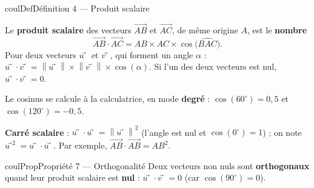 \documentclass[11pt,a4paper]{article}
\makeatletter
\newcommand{\vect}[1]{\overrightarrow{#1}}
\newcommand{\norme}[1]{\left\lVert #1 \right\rVert}
\newcommand{\pt}[3]{\path (#1) node[croix]{} node[#2,font=\small,inner sep=2.5pt]{$#3$};}
\newcounter{lycee@signet}
\newcommand{\signet}[3][]{\stepcounter{lycee@signet}%
  \edef\lycee@dest{\if\relax\detokenize{#1}\relax
    signet.\arabic{lycee@signet}\else#1\fi}%
  \hypertarget{\lycee@dest}{}\bookmark[level=#2,dest=\lycee@dest]{#3}}
\def\vec#1{#1⃗}}%
\newenvironment{definitionbox}[1][Définition]%
  {\begin{boitecours}[phantom={\signet{2}{#1}}]{coulDef}{#1}}{\end{boitecours}}
\newenvironment{proprietebox}[1][Propriété]%
  {\begin{boitecours}[phantom={\signet{2}{#1}}]{coulProp}{#1}}{\end{boitecours}}
\makeatother
\begin{document}
\begin{definitionbox}[Définition 4 --- Produit scalaire]
\begin{minipage}[t]{0.58\linewidth}\raggedright
Le \textbf{produit scalaire} des vecteurs $\vect{AB}$ et $\vect{AC}$, de même origine
$A$, est le \textbf{nombre}
\[
  \vect{AB}\cdot\vect{AC}=AB\times AC\times\cos\big(\widehat{BAC}\big).
\]
Pour deux vecteurs $\vec{u}$ et $\vec{v}$, qui forment un angle $\alpha$ :
$\vec{u}\cdot\vec{v}=\norme{\vec{u}}\times\norme{\vec{v}}\times\cos(\alpha)$.
Si l'un des deux vecteurs est nul, $\vec{u}\cdot\vec{v}=0$.
\end{minipage}\hfill
\begin{minipage}[t]{0.38\linewidth}
\vspace{0pt}\centering
{}
\end{minipage}

\smallskip
Le cosinus se calcule à la calculatrice, en mode \textbf{degré} :
$\cos(60^{\circ})=0{,}5$ et $\cos(120^{\circ})=-0{,}5$.

\smallskip
\textbf{Carré scalaire} : $\vec{u}\cdot\vec{u}=\norme{\vec{u}}^{2}$ (l'angle est nul et
$\cos(0^{\circ})=1$) ; on note $\vec{u}^{2}=\vec{u}\cdot\vec{u}$. Par exemple,
$\vect{AB}\cdot\vect{AB}=AB^{2}$.
\end{definitionbox}

\begin{proprietebox}[Propriété 7 --- Orthogonalité]
Deux vecteurs non nuls sont \textbf{orthogonaux} quand leur produit scalaire est
\textbf{nul} : $\vec{u}\cdot\vec{v}=0$ (car $\cos(90^{\circ})=0$).
\end{proprietebox}
\end{document}

